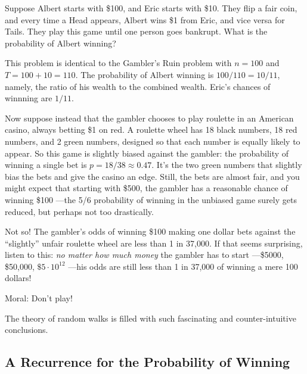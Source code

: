 \begin{editingnotes}

\begin{example}
Suppose Albert starts with \$100, and Eric starts with \$10.  They flip a
fair coin, and every time a Head appears, Albert wins \$1 from Eric, and
vice versa for Tails.  They play this game until one person goes bankrupt.
What is the probability of Albert winning?

This problem is identical to the Gambler's Ruin problem with $n=100$ and
$T=100+10=110$.  The probability of Albert winning is $100/110 = 10/11$,
namely, the ratio of his wealth to the combined wealth.  Eric's chances of
winnning are $1/11$.
\end{example}
\end{editingnotes}


Now suppose instead that the gambler chooses to play roulette in an
American casino, always betting \$1 on red.  A roulette wheel has 18 black
numbers, 18 red numbers, and 2 green numbers, designed so that each number
is equally likely to appear.  So this game is slightly biased against the
gambler: the probability of winning a single bet is $p = 18/38 \approx
0.47$.  It's the two green numbers that slightly bias the bets and give
the casino an edge.  Still, the bets are almost fair, and you might expect
that starting with \$500, the gambler has a reasonable chance of winning
\$100 ---the 5/6 probability of winning in the unbiased game surely gets
reduced, but perhaps not too drastically.

Not so!  The gambler's odds of winning \$100 making one dollar bets
against the ``slightly'' unfair roulette wheel are less than 1 in 37,000.
If that seems surprising, listen to this: \emph{no matter how much money}
the gambler has to start ---\$5000, \$50,000, $\$5 \cdot 10^{12}$ ---his
odds are still less than 1 in 37,000 of winning a mere 100 dollars!

Moral:  Don't play!

The theory of random walks is filled with such fascinating and
counter-intuitive conclusions.

\subsection{A Recurrence for the Probability of Winning}


